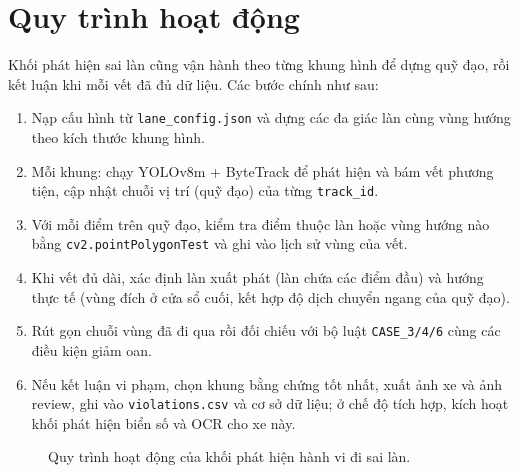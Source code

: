 \documentclass[12pt,a4paper]{report}
\begin{document}
\section{Quy trình hoạt động}
Khối phát hiện sai làn cũng vận hành theo từng khung hình để dựng quỹ đạo, rồi kết luận khi mỗi vết đã đủ dữ liệu. Các bước chính như sau:
\begin{enumerate}[leftmargin=*]
  \item Nạp cấu hình từ \texttt{lane\_config.json} và dựng các đa giác làn cùng vùng hướng theo kích thước khung hình.
  \item Mỗi khung: chạy YOLOv8m + ByteTrack để phát hiện và bám vết phương tiện, cập nhật chuỗi vị trí (quỹ đạo) của từng \texttt{track\_id}.
  \item Với mỗi điểm trên quỹ đạo, kiểm tra điểm thuộc làn hoặc vùng hướng nào bằng \texttt{cv2.pointPolygonTest} và ghi vào lịch sử vùng của vết.
  \item Khi vết đủ dài, xác định làn xuất phát (làn chứa các điểm đầu) và hướng thực tế (vùng đích ở cửa sổ cuối, kết hợp độ dịch chuyển ngang của quỹ đạo).
  \item Rút gọn chuỗi vùng đã đi qua rồi đối chiếu với bộ luật \texttt{CASE\_3/4/6} cùng các điều kiện giảm oan.
  \item Nếu kết luận vi phạm, chọn khung bằng chứng tốt nhất, xuất ảnh xe và ảnh review, ghi vào \texttt{violations.csv} và cơ sở dữ liệu; ở chế độ tích hợp, kích hoạt khối phát hiện biển số và OCR cho xe này.
\end{enumerate}

\begin{figure}[H]
\centering
{}
\caption{Quy trình hoạt động của khối phát hiện hành vi đi sai làn.}
\end{figure}
\end{document}
